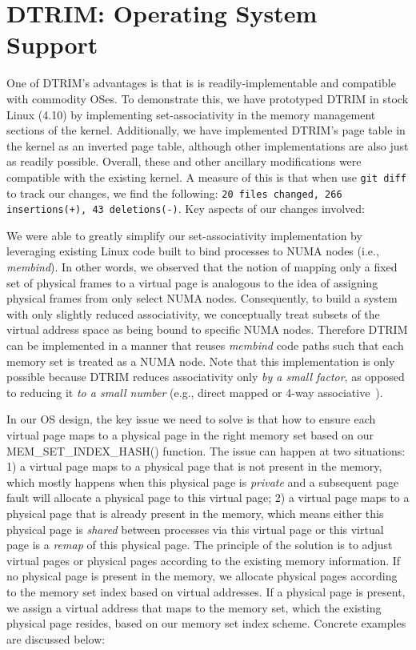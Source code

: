 \section{DTRIM: Operating System Support}
\label{sec:os}

One of DTRIM's advantages is that is is readily-implementable and
compatible with commodity OSes. To demonstrate this, we have
prototyped DTRIM in stock Linux (4.10) by implementing set-associativity in
the memory management sections of the kernel. Additionally, we have
implemented DTRIM's page table in the kernel as an inverted page table,
although other implementations are also just as readily possible. 
Overall, these and other ancillary
modifications were compatible with the existing kernel. A measure of
this is that when use \verb|git diff| to track our changes, we find
the following: \texttt{20 files changed, 266 insertions(+), 43
  deletions(-)}. Key aspects of our changes involved:

\vspace{2mm}
 We were
able to greatly simplify our set-associativity implementation by
leveraging existing Linux code built to bind processes to NUMA nodes
(i.e., {\it membind}). In other words, we observed that the notion of
mapping only a fixed set of physical frames to a virtual page is
analogous to the idea of assigning physical frames from only select
NUMA nodes. Consequently, to build a system with only slightly reduced associativity, 
we conceptually treat subsets of the virtual address space as being bound to specific
NUMA nodes. Therefore DTRIM can be implemented in a manner that
reuses {\it membind} code paths such that each memory set is treated
as a NUMA node. Note that this implementation is only possible because DTRIM
reduces associativity only \textit{by a small factor}, as opposed to reducing it
\textit{to a small number} (e.g., direct mapped or 4-way associative~\cite{picorel:near-memory}). 


\vspace{2mm}
 In our OS design, 
the key issue we need to solve is that how to ensure each virtual page 
maps to a physical page in the right memory set based on our MEM\_SET\_INDEX\_HASH() function. 
The issue can happen at two situations: 1) a virtual page maps to a 
physical page that is not present in the memory, which mostly happens
when this physical page is \textit{private} and a subsequent
page fault will allocate a physical page to this virtual page; 
2) a virtual page maps to a physical page that is already present in the memory,
which means either this physical page is \textit{shared} between processes via this
virtual page or this virtual page is a \textit{remap} of this physical page.
The principle of the solution is to adjust virtual pages or physical pages 
according to the existing memory information. If no physical page is present 
in the memory, we allocate physical pages according to the memory set index 
based on virtual addresses. If a physical page is present, we assign a virtual 
address that maps to the memory set, which the existing physical page 
resides, based on our memory set index scheme. Concrete examples are discussed below:

